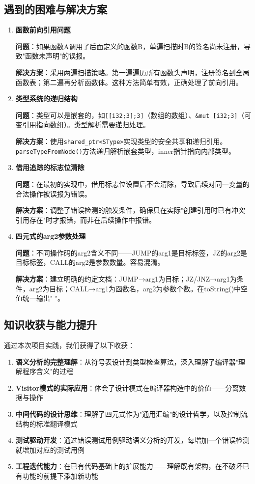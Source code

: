 \documentclass[12pt,a4paper]{ctexart}
\begin{document}
\subsection{遇到的困难与解决方案}

\begin{enumerate}
    \item \textbf{函数前向引用问题}

    \textbf{问题}：如果函数A调用了后面定义的函数B，单遍扫描时B的签名尚未注册，导致"函数未声明"的误报。

    \textbf{解决方案}：采用两遍扫描策略。第一遍遍历所有函数头声明，注册签名到全局函数表；第二遍再分析函数体。这种方法简单有效，正确处理了前向引用。

    \item \textbf{类型系统的递归结构}

    \textbf{问题}：类型可以是嵌套的，如\texttt{[[i32;3];3]}（数组的数组）、\texttt{\&mut [i32;3]}（可变引用指向数组）。类型解析需要递归处理。

    \textbf{解决方案}：使用\texttt{shared\_ptr<SType>}实现类型的安全共享和递归引用。\texttt{parseTypeFromNode()}方法递归解析嵌套类型，inner指针指向内部类型。

    \item \textbf{借用追踪的标志位清除}

    \textbf{问题}：在最初的实现中，借用标志位设置后不会清除，导致后续对同一变量的合法操作被误报为错误。

    \textbf{解决方案}：调整了错误检测的触发条件，确保只在实际"创建引用时已有冲突引用存在"时才报错，而非在后续操作中报错。

    \item \textbf{四元式的arg2参数处理}

    \textbf{问题}：不同操作码的arg2含义不同——JUMP的arg1是目标标签，JZ的arg2是目标标签，CALL的arg2是参数数量。容易混淆。

    \textbf{解决方案}：建立明确的约定文档：JUMP→arg1为目标；JZ/JNZ→arg1为条件，arg2为目标；CALL→arg1为函数名，arg2为参数个数。在toString()中空值统一输出"-"。
\end{enumerate}

\subsection{知识收获与能力提升}

通过本次项目实践，我们获得了以下收获：

\begin{enumerate}
    \item \textbf{语义分析的完整理解}：从符号表设计到类型检查算法，深入理解了编译器"理解程序含义"的过程
    \item \textbf{Visitor模式的实际应用}：体会了设计模式在编译器构造中的价值——分离数据与操作
    \item \textbf{中间代码的设计思维}：理解了四元式作为"通用汇编"的设计哲学，以及控制流结构的标准翻译模式
    \item \textbf{测试驱动开发}：通过错误测试用例驱动语义分析的开发，每增加一个错误检测就增加对应的测试用例
    \item \textbf{工程迭代能力}：在已有代码基础上的扩展能力——理解既有架构，在不破坏已有功能的前提下添加新功能
\end{enumerate}
\end{document}
